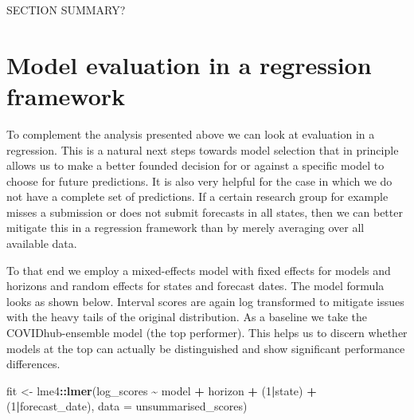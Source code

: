 \documentclass[
]{book}
\newenvironment{Shaded}{\begin{snugshade}}{\end{snugshade}}
\newcommand{\DataTypeTok}[1]{\textcolor[rgb]{0.13,0.29,0.53}{#1}}
\newcommand{\DecValTok}[1]{\textcolor[rgb]{0.00,0.00,0.81}{#1}}
\newcommand{\KeywordTok}[1]{\textcolor[rgb]{0.13,0.29,0.53}{\textbf{#1}}}
\newcommand{\NormalTok}[1]{#1}
\newcommand{\OperatorTok}[1]{\textcolor[rgb]{0.81,0.36,0.00}{\textbf{#1}}}
\newcommand{\StringTok}[1]{\textcolor[rgb]{0.31,0.60,0.02}{#1}}
\begin{document}
SECTION SUMMARY?

\hypertarget{model-evaluation-in-a-regression-framework}{%
\section{Model evaluation in a regression framework}\label{model-evaluation-in-a-regression-framework}}

To complement the analysis presented above we can look at evaluation in a regression. This is a natural next steps towards model selection that in principle allows us to make a better founded decision for or against a specific model to choose for future predictions. It is also very helpful for the case in which we do not have a complete set of predictions. If a certain research group for example misses a submission or does not submit forecasts in all states, then we can better mitigate this in a regression framework than by merely averaging over all available data.

To that end we employ a mixed-effects model with fixed effects for models and horizons and random effects for states and forecast dates. The model formula looks as shown below. Interval scores are again log transformed to mitigate issues with the heavy tails of the original distribution. As a baseline we take the COVIDhub-ensemble model (the top performer). This helps us to discern whether models at the top can actually be distinguished and show significant performance differences.

\begin{Shaded}
\begin{Highlighting}[]
\NormalTok{fit \textless{}{-}}\StringTok{ }\NormalTok{lme4}\OperatorTok{::}\KeywordTok{lmer}\NormalTok{(log\_scores }\OperatorTok{\textasciitilde{}}\StringTok{ }\NormalTok{model }\OperatorTok{+}\StringTok{ }\NormalTok{horizon }\OperatorTok{+}\StringTok{ }\NormalTok{(}\DecValTok{1}\OperatorTok{|}\NormalTok{state) }\OperatorTok{+}\StringTok{ }\NormalTok{(}\DecValTok{1}\OperatorTok{|}\NormalTok{forecast\_date),}
                  \DataTypeTok{data =}\NormalTok{ unsummarised\_scores)}
\end{Highlighting}
\end{Shaded}
\end{document}
